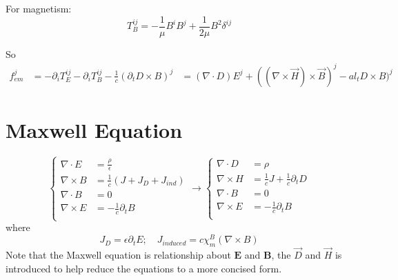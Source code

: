 For magnetism:
\[  T_B^{ij} = -\frac{1}{\mu}B^iB^j + \frac{1}{2\mu}B^2\delta^{ij} \]

So
\[
    \begin{aligned}
	f^j_{em} &= -\partial_iT_E^{ij} - \partial_iT_B^{ij} - \frac{1}{c}(\partial_tD\times B)^j
    &= (\nabla\cdot D)E^j + ((\nabla\times\vec{H})\times\vec{B})^j - al_tD\times B)^j 
    \end{aligned}
\]
\section{Maxwell Equation}
\begin{equation}
    \label{eqn:Maxwell}
    \left\{
    \begin{aligned}
	\nabla\cdot{E} &= \frac{\rho}{\epsilon}	\\
	\nabla\times{B} &= \frac{1}{c}\left(J + J_D + J_{ind}\right)	\\
	\nabla\cdot{B} &= 0  \\
	\nabla\times{E} &= -\frac{1}{c}\partial_{t}B	\\
    \end{aligned}
    \right.
    \longrightarrow
    \left\{
    \begin{aligned}
	\nabla\cdot{D} &= \rho	\\
	\nabla\times{H} &= \frac{1}{c}J +\frac{1}{c}\partial_{t}D    \\
	\nabla\cdot{B} &= 0  \\
	\nabla\times{E} &= -\frac{1}{c}\partial_{t}B	\\
    \end{aligned}
    \right.
\end{equation}
where 
\[J_D = \epsilon\partial_{t}E; \quad J_{induced} = c\chi_m^B(\nabla\times{B})\]
Note that the Maxwell equation is relationship about $\mathbf{E}$ and
$\mathbf{B}$, the $\vec{D}$ and $\vec{H}$ is introduced to help reduce the
equations to a more concised form. 


